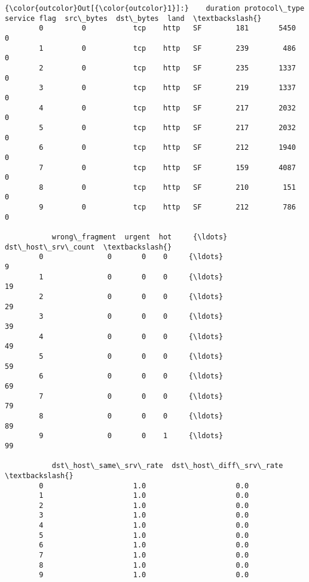 \documentclass[11pt]{article}
\begin{document}
\begin{Verbatim}[commandchars=\\\{\}]
{\color{outcolor}Out[{\color{outcolor}1}]:}    duration protocol\_type service flag  src\_bytes  dst\_bytes  land  \textbackslash{}
        0         0           tcp    http   SF        181       5450     0   
        1         0           tcp    http   SF        239        486     0   
        2         0           tcp    http   SF        235       1337     0   
        3         0           tcp    http   SF        219       1337     0   
        4         0           tcp    http   SF        217       2032     0   
        5         0           tcp    http   SF        217       2032     0   
        6         0           tcp    http   SF        212       1940     0   
        7         0           tcp    http   SF        159       4087     0   
        8         0           tcp    http   SF        210        151     0   
        9         0           tcp    http   SF        212        786     0   
        
           wrong\_fragment  urgent  hot     {\ldots}       dst\_host\_srv\_count  \textbackslash{}
        0               0       0    0     {\ldots}                        9   
        1               0       0    0     {\ldots}                       19   
        2               0       0    0     {\ldots}                       29   
        3               0       0    0     {\ldots}                       39   
        4               0       0    0     {\ldots}                       49   
        5               0       0    0     {\ldots}                       59   
        6               0       0    0     {\ldots}                       69   
        7               0       0    0     {\ldots}                       79   
        8               0       0    0     {\ldots}                       89   
        9               0       0    1     {\ldots}                       99   
        
           dst\_host\_same\_srv\_rate  dst\_host\_diff\_srv\_rate  \textbackslash{}
        0                     1.0                     0.0   
        1                     1.0                     0.0   
        2                     1.0                     0.0   
        3                     1.0                     0.0   
        4                     1.0                     0.0   
        5                     1.0                     0.0   
        6                     1.0                     0.0   
        7                     1.0                     0.0   
        8                     1.0                     0.0   
        9                     1.0                     0.0   
        

\end{Verbatim}
\end{document}
